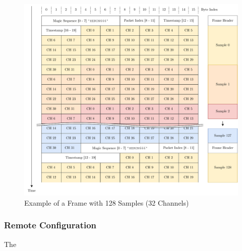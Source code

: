 \begin{figure}[h]
	\centering
	\includegraphics[width=1.0\textwidth]{images/4_design_final/Audio_Stream_Frame.pdf}
	\caption{Example of a Frame with 128 Samples (32 Channels)}
	\label{fig:frame_example}
\end{figure}

\subsubsection{Remote Configuration}
The


